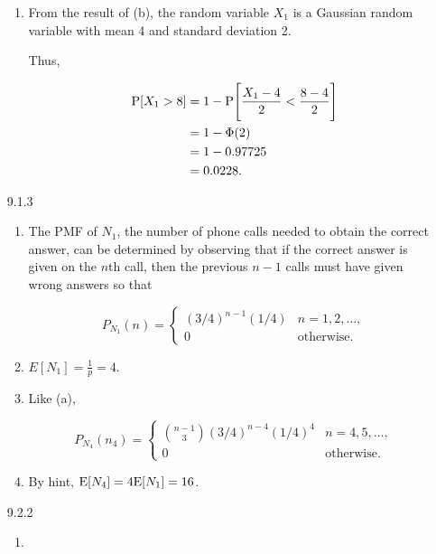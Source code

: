 \documentclass{article}
\begin{document}
\begin{enumerate}
\begin{enumerate}[label=(\alph*)]
        \item From the result of (b), the random variable $X_1$ is a Gaussian random variable with mean 4 and standard deviation 2.

        Thus,

        \begin{align*}
        \text P[X_1 > 8] 
            & = 1 - \text P \Bigg[ \frac{X_1 - 4}{2} < \frac{8 - 4}{2} \Bigg] \\
            & = 1 - \Phi(2) \\
            & = 1 - 0.97725 \\
            & = 0.0228.
        \end{align*}
    \end{enumerate}

    \item [9.1.3]

    \begin{enumerate}[label=(\alph*)]
        \item
        The PMF of $N_1$, the number of phone calls needed to obtain the correct answer, can be determined by observing that if the correct answer is given on the $n$th call, then the previous $n - 1$ calls must have given wrong answers so that

        $$
        P_{N_1}(n) = \begin{cases}
            (3 / 4)^{n - 1}(1 / 4) & n = 1, 2, \dots, \\
            0                      & \text{otherwise}.
        \end{cases}
        $$

        \item $E[N_1] = \frac{1}{p} = 4$.
        \item Like (a),

        $$
        P_{N_4}(n_4) = \begin{cases}
            \binom{n - 1}{3}(3 / 4)^{n - 4}(1 / 4)^4 & n = 4, 5, \dots, \\
            0                      & \text{otherwise}.
        \end{cases}
        $$

        \item By hint, $\text E[N_4] = 4 \text E[N_1] = 16$.

    \end{enumerate}

    \item [9.2.2]

    \begin{enumerate}[label=(\alph*)]
        \item


\end{enumerate}
\end{enumerate}
\end{document}
